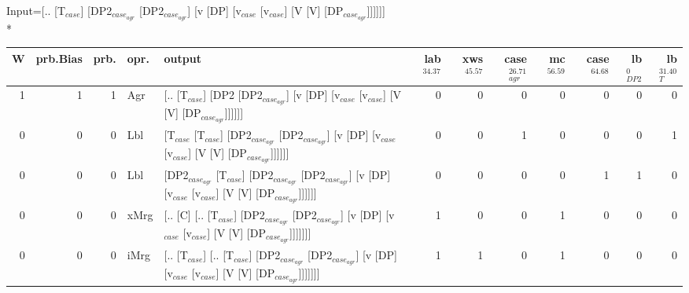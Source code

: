 \begingroup\scriptsize Input=[.. [T$_{case}$] [DP2$_{case_{agr}}$ [DP2$_{case_{agr}}$] [v [DP] [v$_{case}$ [v$_{case}$] [V [V] [DP$_{case_{agr}}$]]]]]]\\*
\begin{tabularx}{\linewidth}{rrrlXrrrrrrr}
\hline
   W &   prb.Bias &   prb. & opr.   & output                                                                                                                                                                           &   lab$^{34.37}$ &   xws$^{45.57}$ &   case$_{agr}^{26.71}$ &   mc$^{56.59}$ &   case$^{64.68}$ &   lb$_{DP2}^{0}$ &   lb$_{T}^{31.40}$ \\
\hline
   1 &       1 &   1 & Agr  & [.. [T$_{case}$] [DP2 [DP2$_{case_{agr}}$] [v [DP] [v$_{case}$ [v$_{case}$] [V [V] [DP$_{case_{agr}}$]]]]]]                                                                                              &             0 &             0 &                  0 &            0 &              0 &            0 &              0 \\
   0 &       0 &   0 & Lbl  & [T$_{case}$ [T$_{case}$] [DP2$_{case_{agr}}$ [DP2$_{case_{agr}}$] [v [DP] [v$_{case}$ [v$_{case}$] [V [V] [DP$_{case_{agr}}$]]]]]]                                                                                 &             0 &             0 &                  1 &            0 &              0 &            0 &              1 \\
   0 &       0 &   0 & Lbl  & [DP2$_{case_{agr}}$ [T$_{case}$] [DP2$_{case_{agr}}$ [DP2$_{case_{agr}}$] [v [DP] [v$_{case}$ [v$_{case}$] [V [V] [DP$_{case_{agr}}$]]]]]]                                                                           &             0 &             0 &                  0 &            0 &              1 &            1 &              0 \\
   0 &       0 &   0 & xMrg & [.. [C] [.. [T$_{case}$] [DP2$_{case_{agr}}$ [DP2$_{case_{agr}}$] [v [DP] [v$_{case}$ [v$_{case}$] [V [V] [DP$_{case_{agr}}$]]]]]]]                                                                            &             1 &             0 &                  0 &            1 &              0 &            0 &              0 \\
   0 &       0 &   0 & iMrg & [.. [T$_{case}$] [.. [T$_{case}$] [DP2$_{case_{agr}}$ [DP2$_{case_{agr}}$] [v [DP] [v$_{case}$ [v$_{case}$] [V [V] [DP$_{case_{agr}}$]]]]]]]                                                                       &             1 &             1 &                  0 &            1 &              0 &            0 &              0 \\

\end{tabularx}
